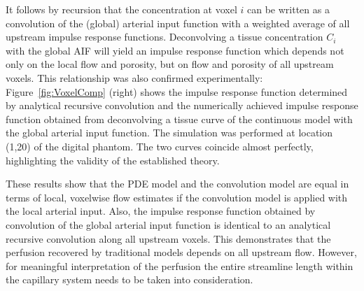 \documentclass[10pt]{article}
\begin{document}
	It follows by recursion that the concentration at voxel $i$ can be written as a convolution of the (global) arterial input function with a weighted average of all upstream impulse response functions.
	Deconvolving a tissue concentration $C_i$ with the global AIF will yield an impulse response function which depends not only on the local flow and porosity, but on flow and porosity of all upstream voxels.
	This relationship was also confirmed experimentally: Figure~\ref{fig:VoxelComp} (right) shows the impulse response function determined by analytical recursive convolution and the numerically achieved impulse response function obtained from deconvolving a tissue curve of the continuous model with the global arterial input function. 
	The simulation was performed at location (1,20) of the digital phantom.
	The two curves coincide almost perfectly, highlighting the validity of the established theory.

These results show that the PDE model and the convolution model are equal in terms of local, voxelwise flow estimates if the convolution model is applied with the local arterial input. 
Also, the impulse response function obtained by convolution of the global arterial input function is identical to an analytical recursive convolution along all upstream voxels. 
This demonstrates that the perfusion recovered by traditional models depends on all upstream flow.
However, for meaningful interpretation of the perfusion the entire streamline length within the capillary system needs to be taken into consideration.
\end{document}
